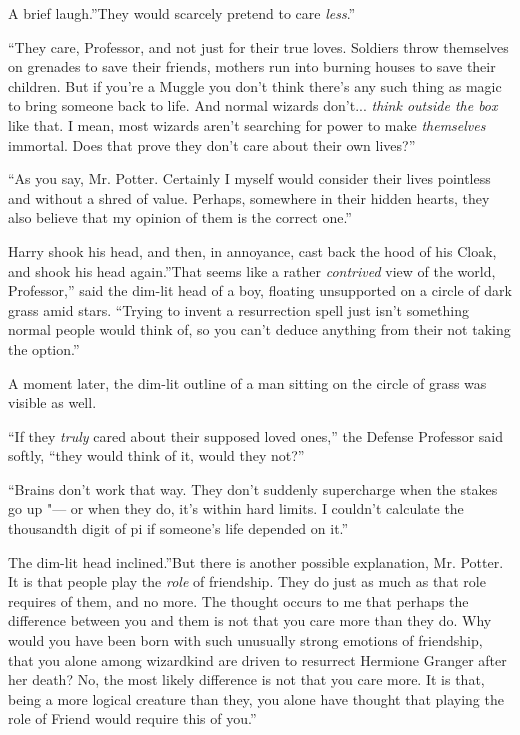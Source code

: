 A brief laugh.''They would scarcely pretend to care \emph{less}.''

``They care, Professor, and not just for their true loves. Soldiers throw
themselves on grenades to save their friends, mothers run into burning
houses to save their children. But if you're a Muggle you don't think
there's any such thing as magic to bring someone back to life. And
normal wizards don't... \emph{think outside the box} like that. I
mean, most wizards aren't searching for power to make \emph{themselves}
immortal. Does that prove they don't care about their own lives?''

``As you say, Mr. Potter. Certainly I myself would consider their lives
pointless and without a shred of value. Perhaps, somewhere in their
hidden hearts, they also believe that my opinion of them is the correct
one.''

Harry shook his head, and then, in annoyance, cast back the hood of his
Cloak, and shook his head again.''That seems like a rather
\emph{contrived} view of the world, Professor,'' said the dim-lit head
of a boy, floating unsupported on a circle of dark grass amid stars.
``Trying to invent a resurrection spell just isn't something normal
people would think of, so you can't deduce anything from their not
taking the option.''

A moment later, the dim-lit outline of a man sitting on the circle of
grass was visible as well.

``If they \emph{truly} cared about their supposed loved ones,'' the
Defense Professor said softly, ``they would think of it, would they
not?''

``Brains don't work that way. They don't suddenly supercharge when the
stakes go up "--- or when they do, it's within hard limits. I couldn't
calculate the thousandth digit of pi if someone's life depended on it.''

The dim-lit head inclined.''But there is another possible explanation,
Mr. Potter. It is that people play the \emph{role} of friendship. They
do just as much as that role requires of them, and no more. The thought
occurs to me that perhaps the difference between you and them is not
that you care more than they do. Why would you have been born with such
unusually strong emotions of friendship, that you alone among wizardkind
are driven to resurrect Hermione Granger after her death? No, the most
likely difference is not that you care more. It is that, being a more
logical creature than they, you alone have thought that playing the role
of Friend would require this of you.''

